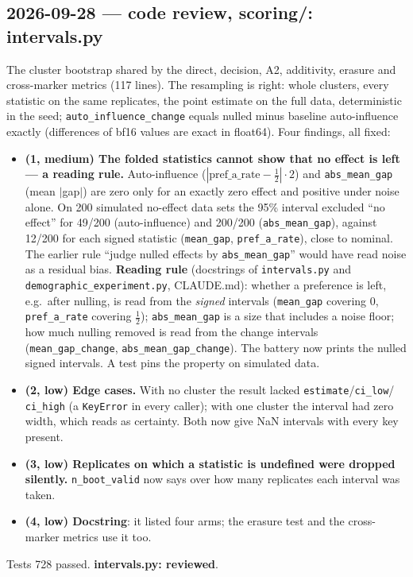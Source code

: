 \documentclass{article}
\begin{document}
\subsection*{2026-09-28 --- code review, scoring/: intervals.py}
The cluster bootstrap shared by the direct, decision, A2, additivity, erasure and cross-marker metrics (117 lines).
The resampling is right: whole clusters, every statistic on the same replicates, the point estimate on the full
data, deterministic in the seed; \texttt{auto\_influence\_change} equals nulled minus baseline auto-influence
exactly (differences of bf16 values are exact in float64). Four findings, all fixed:
\begin{itemize}
  \item \textbf{(1, medium) The folded statistics cannot show that no effect is left --- a reading rule.}
        Auto-influence ($|\text{pref\_a\_rate}-\tfrac12|\cdot2$) and \texttt{abs\_mean\_gap} (mean $|$gap$|$) are
        zero only for an exactly zero effect and positive under noise alone. On 200 simulated no-effect data sets
        the 95\% interval excluded ``no effect'' for 49/200 (auto-influence) and 200/200 (\texttt{abs\_mean\_gap}),
        against 12/200 for each signed statistic (\texttt{mean\_gap}, \texttt{pref\_a\_rate}), close to nominal.
        The earlier rule ``judge nulled effects by \texttt{abs\_mean\_gap}'' would have read noise as a residual
        bias. \textbf{Reading rule} (docstrings of \texttt{intervals.py} and \texttt{demographic\_experiment.py},
        CLAUDE.md): whether a preference is left, e.g.\ after nulling, is read from the \emph{signed} intervals
        (\texttt{mean\_gap} covering 0, \texttt{pref\_a\_rate} covering $\tfrac12$); \texttt{abs\_mean\_gap} is a
        size that includes a noise floor; how much nulling removed is read from the change intervals
        (\texttt{mean\_gap\_change}, \texttt{abs\_mean\_gap\_change}). The battery now prints the nulled signed
        intervals. A test pins the property on simulated data.
  \item \textbf{(2, low) Edge cases.} With no cluster the result lacked \texttt{estimate}/\texttt{ci\_low}/
        \texttt{ci\_high} (a \texttt{KeyError} in every caller); with one cluster the interval had zero width,
        which reads as certainty. Both now give NaN intervals with every key present.
  \item \textbf{(3, low) Replicates on which a statistic is undefined were dropped silently.}
        \texttt{n\_boot\_valid} now says over how many replicates each interval was taken.
  \item \textbf{(4, low) Docstring}: it listed four arms; the erasure test and the cross-marker metrics use it too.
\end{itemize}
Tests 728 passed. \textbf{intervals.py: reviewed}.
\end{document}
